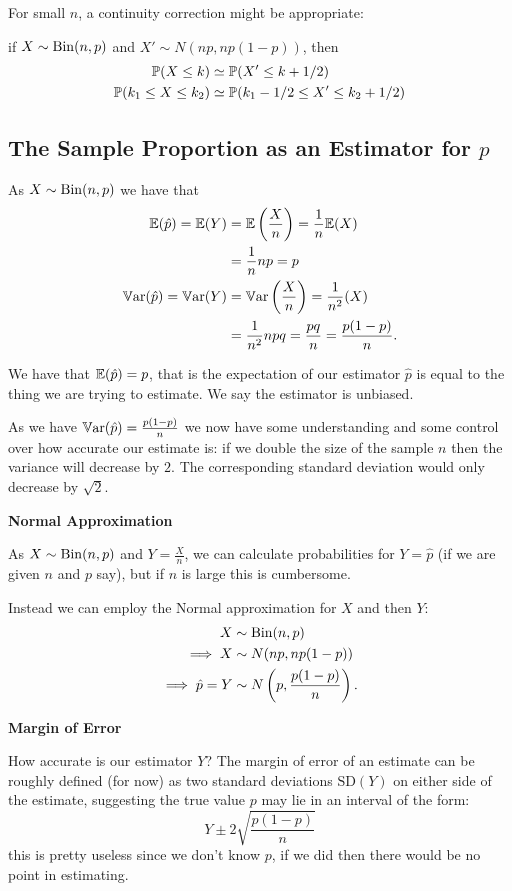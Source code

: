\documentclass[10pt, a4paper]{article}
\begin{document}
For small $n$,
a continuity correction might be appropriate:

if $X \sim \Bin(n, p)$ and $X' \sim N(np, np(1 - p))$,
then
\begin{align*}
    \P(X \leq k) &\simeq \P(X' \leq k + 1 / 2) \\
    \P(k_1 \leq X \leq k_2) &\simeq \P(k_1 - 1 / 2 \leq X' \leq k_2 + 1 / 2)
\end{align*}

\subsection{The Sample Proportion as an Estimator for \texorpdfstring{$p$}{}}
As $X \sim \Bin(n, p)$ we have that
\begin{align*}
    \E(\hat{p}) = \E(Y) &= \E\left(\frac{X}{n}\right) = \frac{1}{n}\E(X) \\
    &= \frac{1}{n}np = p \\
    \Var(\hat{p}) = \Var(Y) &= \Var\left(\frac{X}{n}\right) = \frac{1}{n ^ 2}(X) \\
    &= \frac{1}{n ^ 2}npq = \frac{pq}{n} = \frac{p(1 - p)}{n}.
\end{align*}

We have that $\E(\hat{p}) = p$,
that is the expectation of our estimator $\hat{p}$ is equal to the thing we are trying to estimate.
We say the estimator is unbiased.

As we have $\Var(\hat{p}) = \frac{p(1 - p)}{n}$ we now have some understanding and some control over how accurate our estimate is:
if we double the size of the sample $n$ then the variance will decrease by $2$.
The corresponding standard deviation would only decrease by $\sqrt{2}$.

\textbf{Normal Approximation}

As $X \sim \Bin(n, p)$ and $Y = \frac{X}{n}$,
we can calculate probabilities for $Y = \hat{p}$
(if we are given $n$ and $p$ say),
but if $n$ is large this is cumbersome.

Instead we can employ the Normal approximation for $X$ and then $Y$:
\begin{align*}
    X &\sim \Bin(n, p) \\
    \implies X &\sim N(np, np(1 - p)) \\
\implies \hat{p} = Y &\sim N\left(p, \frac{p(1 - p)}{n}\right).
\end{align*}

\textbf{Margin of Error}

How accurate is our estimator $Y$?
The margin of error of an estimate can be roughly defined
(for now)
as two standard deviations $\mathrm{SD}(Y)$ on either side of the estimate,
suggesting the true value $p$ may lie in an interval of the form:
\[
Y \pm 2\sqrt{\frac{p(1 - p)}{n}}
\]
this is pretty useless since we don't know $p$,
if we did then there would be no point in estimating.
\end{document}
